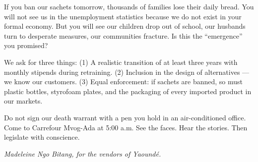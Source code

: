 \documentclass[11pt]{article}
\newcounter{popsec}
\newcounter{popsub}
\newcommand{\courssub}[1]{%
  \stepcounter{popsub}%
  \par\vspace{9pt}\noindent{\popxbold\fontsize{11.5}{13}\selectfont\color{popink}{\color{poporange}\thepopsec.\thepopsub}\hspace{6pt}#1}\par\nopagebreak\vspace{4pt}
}
\begin{document}
If you ban our sachets tomorrow, thousands of families lose their daily bread. You will not see us in the unemployment statistics because we do not exist in your formal economy. But you will see our children drop out of school, our husbands turn to desperate measures, our communities fracture. Is this the ``emergence'' you promised?

We ask for three things: (1) A realistic transition of at least three years with monthly stipends during retraining. (2) Inclusion in the design of alternatives --- we know our customers. (3) Equal enforcement: if sachets are banned, so must plastic bottles, styrofoam plates, and the packaging of every imported product in our markets.

Do not sign our death warrant with a pen you hold in an air-conditioned office. Come to Carrefour Mvog-Ada at 5:00 a.m. See the faces. Hear the stories. Then legislate with conscience.

\emph{Madeleine Ngo Bitang, for the vendors of Yaoundé.}

\courssub{Tasks}
\end{document}
